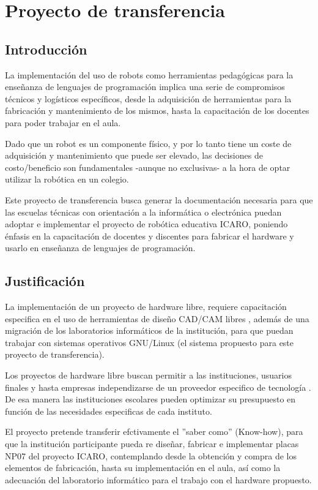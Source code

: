 \chapter{Proyecto de transferencia}

\section{Introducción}

La implementación del uso de robots como herramientas pedagógicas para la enseñanza de lenguajes de programación implica una serie de compromisos técnicos y logísticos específicos, desde la adquisición de herramientas para la fabricación y mantenimiento de los mismos, hasta la capacitación de los docentes para poder trabajar en el aula.

Dado que un robot es un componente físico, y por lo tanto tiene un coste de adquisición y mantenimiento que puede ser elevado, las decisiones de costo/beneficio son fundamentales -aunque no exclusivas- a la hora de optar utilizar la robótica en un colegio.

Este proyecto de transferencia busca generar la documentación necesaria para que las escuelas técnicas con orientación a la informática o electrónica puedan adoptar e implementar el proyecto de robótica educativa ICARO, poniendo énfasis en la capacitación de docentes y discentes para fabricar el hardware y usarlo en enseñanza de lenguajes de programación.


\section{Justificación}

La implementación de un proyecto de hardware libre, requiere capacitación  especifica en el uso de herramientas de diseño CAD/CAM libres \citep{bareno2011metodologia}, además de una migración de los laboratorios informáticos de la institución, para que puedan trabajar con sistemas operativos GNU/Linux (el sistema propuesto para este proyecto de transferencia).

Los proyectos de hardware libre buscan permitir a las instituciones, usuarios finales y hasta empresas independizarse de un proveedor especifico de tecnología \citep{gonzalez_hardware_2003}. De esa manera las instituciones escolares pueden optimizar su presupuesto en función de las necesidades especificas de cada instituto.

El proyecto pretende transferir efctivamente el ''saber como'' (Know-how), para que la institución participante pueda re diseñar, fabricar e implementar placas NP07 del proyecto ICARO, contemplando desde la obtención y compra de los elementos de fabricación, hasta su implementación en el aula, así como la adecuación del laboratorio informático para el trabajo con el hardware propuesto.
 
